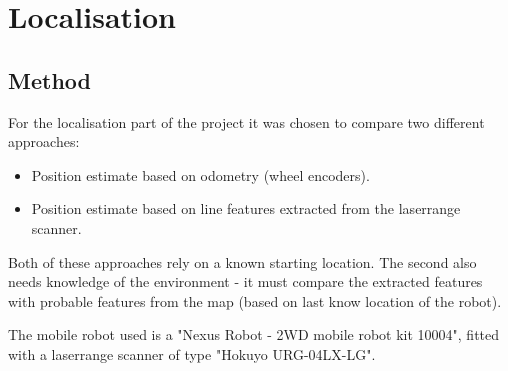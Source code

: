 \section{Localisation}
\subsection{Method}
For the localisation part of the project it was chosen to compare two different approaches:

\begin{itemize}
	\item Position estimate based on odometry (wheel encoders).
	\item Position estimate based on line features extracted from the laserrange scanner. 
\end{itemize}

Both of these approaches rely on a known starting location. The second also needs knowledge of the environment - it must  compare the extracted features with probable features from the map (based on last know location of the robot). 


The mobile robot used is a "Nexus Robot - 2WD mobile robot kit 10004", fitted with a laserrange scanner of type "Hokuyo URG-04LX-LG". 


